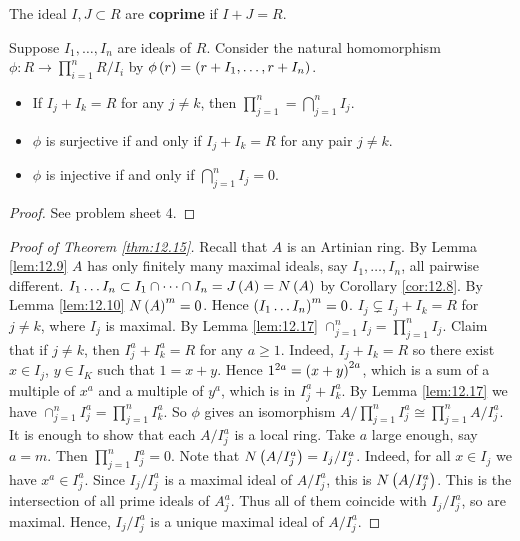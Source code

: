 \begin{definition}
The ideal $ I, J \subset R $ are \textbf{coprime} if $ I + J = R $.
\end{definition}

Suppose $ I_1, \dots, I_n $ are ideals of $ R $. Consider the natural homomorphism $ \phi : R \to \prod_{i = 1}^n R / I_i $ by $ \phi\left( r \right) = \left( r + I_1, \dots, r + I_n \right) $.

\begin{lemma}
\label{lem:12.17}
\hfill
\begin{itemize}
\item If $ I_j + I_k = R $ for any $ j \ne k $, then $ \prod_{j = 1}^n = \bigcap_{j = 1}^n I_j $.
\item $ \phi $ is surjective if and only if $ I_j + I_k = R $ for any pair $ j \ne k $.
\item $ \phi $ is injective if and only if $ \bigcap_{j = 1}^n I_j = 0 $.
\end{itemize}
\end{lemma}

\begin{proof}
See problem sheet 4.
\end{proof}

\begin{proof}[Proof of Theorem \ref{thm:12.15}]
Recall that $ A $ is an Artinian ring. By Lemma \ref{lem:12.9} $ A $ has only finitely many maximal ideals, say $ I_1, \dots, I_n $, all pairwise different. $ I_1 \dots I_n \subset I_1 \cap \dots \cap I_n = J\left( A \right) = N\left( A \right) $ by Corollary \ref{cor:12.8}. By Lemma \ref{lem:12.10} $ N\left( A \right)^m = 0 $. Hence $ \left( I_1 \dots I_n \right)^m = 0 $. $ I_j \subsetneq I_j + I_k = R $ for $ j \ne k $, where $ I_j $ is maximal. By Lemma \ref{lem:12.17} $ \cap_{j = 1}^n I_j = \prod_{j = 1}^n I_j $. Claim that if $ j \ne k $, then $ I_j^a + I_k^a = R $ for any $ a \ge 1 $. Indeed, $ I_j + I_k = R $ so there exist $ x \in I_j $, $ y \in I_K $ such that $ 1 = x + y $. Hence $ 1^{2a} = \left( x + y \right)^{2a} $, which is a sum of a multiple of $ x^a $ and a multiple of $ y^a $, which is in $ I_j^a + I_k^a $. By Lemma \ref{lem:12.17} we have $ \cap_{j = 1}^n I_j^a = \prod_{j = 1}^n I_k^a $. So $ \phi $ gives an isomorphism $ A / \prod_{j = 1}^n I_j^a \cong \prod_{j = 1}^n A / I_j^a $. It is enough to show that each $ A / I_j^a $ is a local ring. Take $ a $ large enough, say $ a = m $. Then $ \prod_{j = 1}^n I_j^a = 0 $. Note that $ N\left( A / I_j^a \right) = I_j / I_j^a $. Indeed, for all $ x \in I_j $ we have $ x^a \in I_j^a $. Since $ I_j / I_j^a $ is a maximal ideal of $ A / I_j^a $, this is $ N\left( A / I_j^a \right) $. This is the intersection of all prime ideals of $ A_j^a $. Thus all of them coincide with $ I_j / I_j^a $, so are maximal. Hence, $ I_j / I_j^a $ is a unique maximal ideal of $ A / I_j^a $.
\end{proof}

